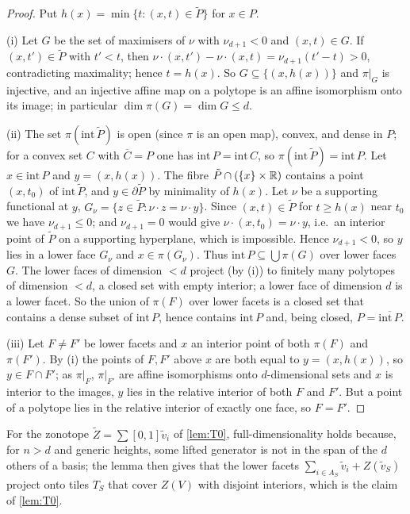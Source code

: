 \begin{proof}
Put $h(x)=\min\{t:(x,t)\in\tilde P\}$ for $x\in P$.

(i) Let $G$ be the set of maximisers of $\nu$ with $\nu_{d+1}<0$ and $(x,t)\in G$. If $(x,t')\in\tilde P$ with $t'<t$, then $\nu\cdot(x,t')-\nu\cdot(x,t)=\nu_{d+1}(t'-t)>0$, contradicting maximality; hence $t=h(x)$. So $G\subseteq\{(x,h(x))\}$ and $\pi|_G$ is injective, and an injective affine map on a polytope is an affine isomorphism onto its image; in particular $\dim\pi(G)=\dim G\le d$.

(ii) The set $\pi(\mathrm{int}\,\tilde P)$ is open (since $\pi$ is an open map), convex, and dense in $P$; for a convex set $C$ with $\overline C=P$ one has $\mathrm{int}\,P=\mathrm{int}\,C$, so $\pi(\mathrm{int}\,\tilde P)=\mathrm{int}\,P$. Let $x\in\mathrm{int}\,P$ and $y=(x,h(x))$. The fibre $\tilde P\cap(\{x\}\times\mathbb R)$ contains a point $(x,t_0)$ of $\mathrm{int}\,\tilde P$, and $y\in\partial\tilde P$ by minimality of $h(x)$. Let $\nu$ be a supporting functional at $y$, $G_\nu=\{z\in\tilde P:\nu\cdot z=\nu\cdot y\}$. Since $(x,t)\in\tilde P$ for $t\ge h(x)$ near $t_0$ we have $\nu_{d+1}\le0$; and $\nu_{d+1}=0$ would give $\nu\cdot(x,t_0)=\nu\cdot y$, i.e.\ an interior point of $\tilde P$ on a supporting hyperplane, which is impossible. Hence $\nu_{d+1}<0$, so $y$ lies in a lower face $G_\nu$ and $x\in\pi(G_\nu)$. Thus $\mathrm{int}\,P\subseteq\bigcup\pi(G)$ over lower faces $G$. The lower faces of dimension $<d$ project (by (i)) to finitely many polytopes of dimension $<d$, a closed set with empty interior; a lower face of dimension $d$ is a lower facet. So the union of $\pi(F)$ over lower facets is a closed set that contains a dense subset of $\mathrm{int}\,P$, hence contains $\mathrm{int}\,P$ and, being closed, $P=\overline{\mathrm{int}\,P}$.

(iii) Let $F\ne F'$ be lower facets and $x$ an interior point of both $\pi(F)$ and $\pi(F')$. By (i) the points of $F,F'$ above $x$ are both equal to $y=(x,h(x))$, so $y\in F\cap F'$; as $\pi|_F$, $\pi|_{F'}$ are affine isomorphisms onto $d$-dimensional sets and $x$ is interior to the images, $y$ lies in the relative interior of both $F$ and $F'$. But a point of a polytope lies in the relative interior of exactly one face, so $F=F'$. \qedhere
\end{proof}
\begin{remark}
For the zonotope $\tilde Z=\sum[0,1]\tilde v_i$ of \cref{lem:T0}, full-dimensionality holds because, for $n>d$ and generic heights, some lifted generator is not in the span of the $d$ others of a basis; the lemma then gives that the lower facets $\sum_{i\in A_S}\tilde v_i+Z(\tilde v_S)$ project onto tiles $T_S$ that cover $Z(V)$ with disjoint interiors, which is the claim of \cref{lem:T0}.
\end{remark}
